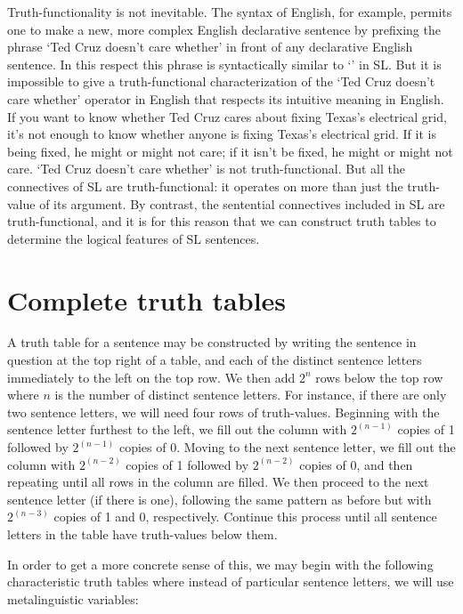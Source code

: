 Truth-functionality is not inevitable.
The syntax of English, for example, permits one to make a new, more complex English declarative sentence by prefixing the phrase `Ted Cruz doesn't care whether' in front of any declarative English sentence.
In this respect this phrase is syntactically similar to `\enot' in SL.
But it is impossible to give a truth-functional characterization of the `Ted Cruz doesn't care whether' operator in English that respects its intuitive meaning in English.
If you want to know whether Ted Cruz cares about fixing Texas's electrical grid, it's not enough to know whether anyone is fixing Texas's electrical grid.
If it is being fixed, he might or might not care; if it isn't be fixed, he might or might not care. 
`Ted Cruz doesn't care whether' is not truth-functional. But all the connectives of SL are truth-functional: it operates on more than just the truth-value of its argument.
By contrast, the sentential connectives included in SL are truth-functional, and it is for this reason that we can construct truth tables to determine the logical features of SL sentences.



\section{Complete truth tables}

A truth table for a sentence may be constructed by writing the sentence in question at the top right of a table, and each of the distinct sentence letters immediately to the left on the top row.
We then add $2^n$ rows below the top row where $n$ is the number of distinct sentence letters. 
For instance, if there are only two sentence letters, we will need four rows of truth-values.
Beginning with the sentence letter furthest to the left, we fill out the column with $2^{(n-1)}$ copies of 1 followed by $2^{(n-1)}$ copies of 0.
Moving to the next sentence letter, we fill out the column with $2^{(n-2)}$ copies of 1 followed by $2^{(n-2)}$ copies of 0, and then repeating until all rows in the column are filled.
We then proceed to the next sentence letter (if there is one), following the same pattern as before but with $2^{(n-3)}$ copies of 1 and 0, respectively.
Continue this process until all sentence letters in the table have truth-values below them.

In order to get a more concrete sense of this, we may begin with the following characteristic truth tables where instead of particular sentence letters, we will use metalinguistic variables:

